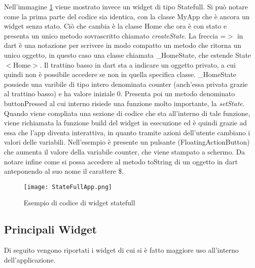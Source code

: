 	Nell'immagine \ref{statefull} viene mostrato invece un widget di tipo
	Statefull. Si può notare come la prima parte del codice sia identica, con la
	classe MyApp che è ancora un widget senza stato. Ciò che cambia è la classe
	Home che ora è con stato e presenta un unico metodo sovrascritto chiamato
	\textit{createState}. La freccia =$>$ in dart è una notazione per scrivere in
	modo compatto un metodo che ritorna un unico oggetto, in questo caso una
	classe chiamata \_HomeState, che estende State$<$Home$>$. Il trattino basso
	in dart sta a indicare un oggetto privato, a cui quindi non è possibile
	accedere se non in quella specifica classe. \_HomeState possiede una
	varibile di tipo intero denominata counter (anch'essa privata grazie al
	trattino basso) e ha valore iniziale 0. Presenta poi un metodo denominato
	buttonPressed al cui interno risiede una funzione molto importante, la
	\textit{setState}. Quando viene compliata una sezione di codice che sta
	all'interno di tale funzione, viene richiamata la funzione build del widget
	in esecuzione ed è quindi grazie ad essa che l'app diventa interattiva, in
	quanto tramite azioni dell'utente cambiano i valori delle variabili.
	Nell'esempio è presente un pulsante (FloatingActionButton) che aumenta il
	valore della variabile counter, che viene stampato a schermo. Da notare
	infine come si possa accedere al metodo toString di un oggetto in dart
	anteponendo al suo nome il carattere \$.

	\begin{figure}[h!]
		\centering
		\caption{Esempio di codice di widget statefull}{\texttt{[image: StateFullApp.png]}\label{statefull}}
	\end{figure}

	\subsection{Principali Widget}
	Di seguito vengono riportati i widget di cui si è fatto maggiore uso
	all'interno dell'applicazione.
	
